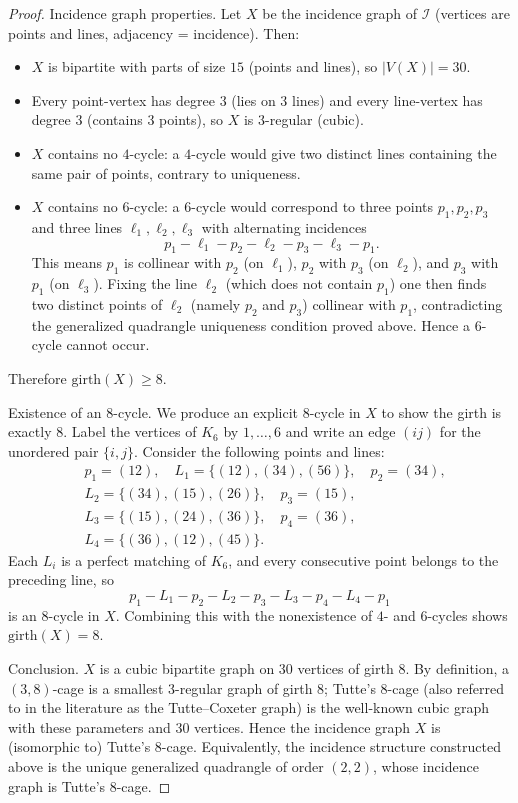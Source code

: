 \documentclass[12pt,a4paper,openany]{book}
\begin{document}
\begin{proof}
Incidence graph properties.  Let $X$ be the incidence graph of $\mathcal{I}$ (vertices are points and lines, adjacency = incidence). Then:
\begin{itemize}
\item $X$ is bipartite with parts of size $15$ (points and lines), so $|V(X)|=30$.
\item Every point-vertex has degree $3$ (lies on $3$ lines) and every line-vertex has degree $3$ (contains $3$ points), so $X$ is $3$-regular (cubic).
\item $X$ contains no $4$-cycle: a $4$-cycle would give two distinct lines containing the same pair of points, contrary to uniqueness.
\item $X$ contains no $6$-cycle: a $6$-cycle would correspond to three points $p_1,p_2,p_3$ and three lines $\ell_1,\ell_2,\ell_3$ with alternating incidences
  \[
  p_1-\ell_1-p_2-\ell_2-p_3-\ell_3-p_1.
  \]
  This means $p_1$ is collinear with $p_2$ (on $\ell_1$), $p_2$ with $p_3$ (on $\ell_2$), and $p_3$ with $p_1$ (on $\ell_3$). Fixing the line $\ell_2$ (which does not contain $p_1$) one then finds two distinct points of $\ell_2$ (namely $p_2$ and $p_3$) collinear with $p_1$, contradicting the generalized quadrangle uniqueness condition proved above. Hence a $6$-cycle cannot occur.
\end{itemize}
Therefore $\mathrm{girth}(X)\ge 8$.

Existence of an $8$-cycle.  We produce an explicit $8$-cycle in $X$ to show the girth is exactly $8$. Label the vertices of $K_6$ by $1,\dots,6$ and write an edge $(ij)$ for the unordered pair $\{i,j\}$. Consider the following points and lines:
\[
\begin{aligned}
&p_1=(12),\quad L_1=\{(12),(34),(56)\},\quad p_2=(34),\\
&L_2=\{(34),(15),(26)\},\quad p_3=(15),\\
&L_3=\{(15),(24),(36)\},\quad p_4=(36),\\
&L_4=\{(36),(12),(45)\}.
\end{aligned}
\]
Each $L_i$ is a perfect matching of $K_6$, and every consecutive point belongs to the preceding line, so
\[
p_1-L_1-p_2-L_2-p_3-L_3-p_4-L_4-p_1
\]
is an $8$-cycle in $X$. Combining this with the nonexistence of $4$- and $6$-cycles shows $\mathrm{girth}(X)=8$.

Conclusion.  $X$ is a cubic bipartite graph on $30$ vertices of girth $8$. By definition, a $(3,8)$-cage is a smallest 3-regular graph of girth 8; Tutte's $8$-cage (also referred to in the literature as the Tutte–Coxeter graph) is the well-known cubic graph with these parameters and $30$ vertices. Hence the incidence graph $X$ is (isomorphic to) Tutte's $8$-cage. Equivalently, the incidence structure constructed above is the unique generalized quadrangle of order $(2,2)$, whose incidence graph is Tutte's $8$-cage.
\end{proof}
\end{document}
